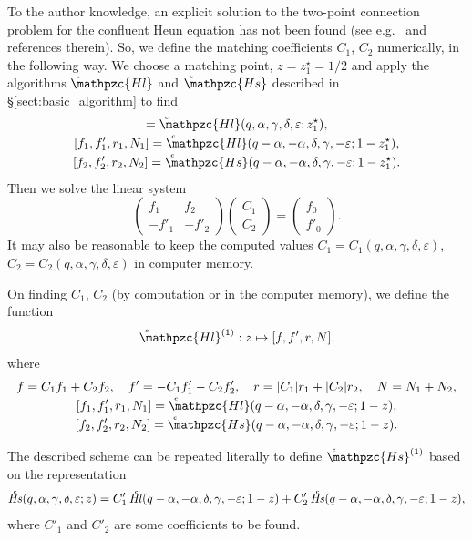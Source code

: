 \documentclass[11pt]{article}
\newcommand{\MF}[1]{\mathop{#1}\nolimits}
\def\midpoint#1{z^\star_{#1}}%
\def\HeunCl{\setbox0=\hbox{\tiny\itshape\bfseries \kern1.52mm c}\wd0=0pt\ht0=0pt\dp0=0pt\MF{\textit{\hbox{\raise1.67ex\copy0}Hl\/}}}%
\def\HeunCs{\setbox0=\hbox{\tiny\itshape\bfseries \kern1.52mm c}\wd0=0pt\ht0=0pt\dp0=0pt\MF{\textit{\hbox{\raise1.67ex\copy0}Hs\/}}}%
\def\psHeunClfin{\setbox0=\hbox{\tiny\itshape\bfseries \kern1.52mm c}\wd0=0pt\ht0=0pt\dp0=0pt\MF{\hbox{\raise1.67ex\copy0}\mathpzc{Hl}}}%
\def\psHeunCsfin{\setbox0=\hbox{\tiny\itshape\bfseries \kern1.52mm c}\wd0=0pt\ht0=0pt\dp0=0pt\MF{\hbox{\raise1.67ex\copy0}\mathpzc{Hs}}}%
\def\psHeunClnearone{\setbox0=\hbox{\tiny\itshape\bfseries \kern1.52mm c}\wd0=0pt\ht0=0pt\dp0=0pt\MF{\hbox{\raise1.67ex\copy0}\mathpzc{Hl}^{(1)}}}%
\def\psHeunCsnearone{\setbox0=\hbox{\tiny\itshape\bfseries \kern1.52mm c}\wd0=0pt\ht0=0pt\dp0=0pt\MF{\hbox{\raise1.67ex\copy0}\mathpzc{Hs}^{(1)}}}%
\begin{document}
To the author knowledge, an explicit solution to the
two-point connection problem for the confluent Heun equation has not been found (see e.g.\ \cite{Kazakov2006} and references therein). So, we define the matching
coefficients $C_1$, $C_2$ numerically, in the following way. We choose a matching point,
$z=\midpoint{1}=1/2$ and apply the algorithms $\psHeunClfin$ and $\psHeunCsfin$ described in
\S\;\ref{sect:basic_algorithm} to find
\begin{gather*}
 [f_0,f'_0,r_0,N_0]=\psHeunClfin(q,\alpha,\gamma,\delta,\varepsilon;\midpoint{1}),\\
 [f_1,f'_1,r_1,N_1]=\psHeunClfin(q-\alpha,-\alpha,\delta,\gamma,-\varepsilon;1-\midpoint{1}),\\ 
 [f_2,f'_2,r_2,N_2]=\psHeunCsfin(q-\alpha,-\alpha,\delta,\gamma,-\varepsilon;1-\midpoint{1}). 
\end{gather*}
Then we solve the linear system
\[
\left(\begin{matrix} f_1 & f_2\\
 -f'_1 & -f'_2
\end{matrix}\right)
\left(\begin{matrix}
C_1\\C_2
\end{matrix}\right)=
\left(\begin{matrix}
f_0\\f'_0
\end{matrix}\right).
\]
It may also be reasonable to keep the computed values $C_1=C_1(q,\alpha,\gamma,\delta,\varepsilon)$,
$C_2=C_2(q,\alpha,\gamma,\delta,\varepsilon)$ in computer memory.

On finding $C_1$, $C_2$ (by computation or in the computer memory), we define the function
\begin{equation*}
 \psHeunClnearone: z\mapsto [f,f',r,N],
\end{equation*}
where 
\begin{gather*}
 f=C_1 f_1 + C_2 f_2,\quad 
 f'=-C_1 f'_1 - C_2 f'_2,\quad
 r = |C_1|r_1 + |C_2|r_2,\quad
 N = N_1 + N_2,\\
 [f_1,f'_1,r_1,N_1]=\psHeunClfin(q-\alpha,-\alpha,\delta,\gamma,-\varepsilon;1-z),\\
 [f_2,f'_2,r_2,N_2]=\psHeunCsfin(q-\alpha,-\alpha,\delta,\gamma,-\varepsilon;1-z).
\end{gather*}

The described scheme can be repeated literally to define $\psHeunCsnearone$ based
on the representation
\begin{equation}
\HeunCs(q,\alpha,\gamma,\delta,\varepsilon;z) = 
C'_1\HeunCl(q-\alpha,-\alpha,\delta,\gamma,-\varepsilon;1-z)+
C'_2\HeunCs(q-\alpha,-\alpha,\delta,\gamma,-\varepsilon;1-z),
\label{eq:near1s}
\end{equation}
where $C'_1$ and $C'_2$ are some coefficients to be found.
\end{document}
